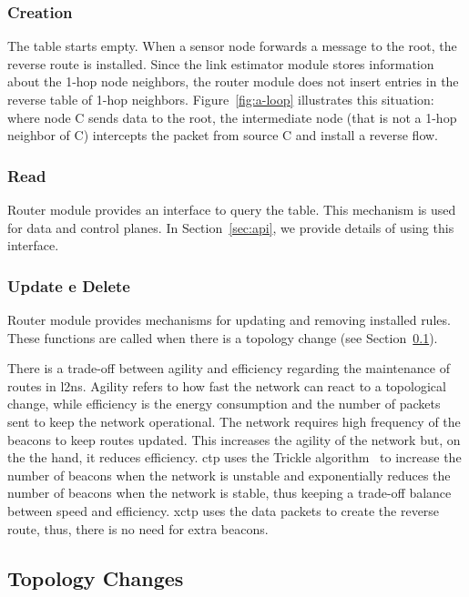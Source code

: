 \subsubsection{Creation} The table starts empty. When a sensor node forwards a message to the root, the reverse route is installed. Since the link estimator module stores information about the 1-hop node neighbors, the router module does not insert entries in the reverse table of 1-hop neighbors. Figure~\ref{fig:a-loop} illustrates this situation: where node C sends data to the root, the intermediate node (that is not a 1-hop neighbor of C) intercepts the packet from source C and install a reverse flow.

\subsubsection{Read} Router module provides an interface to query the table. This mechanism is used for data and control planes. In Section~\ref{sec:api}, we provide details of using this interface.

\subsubsection{Update e Delete} Router module provides mechanisms for updating and removing installed rules. These functions are called when there is a topology change (see Section~\ref{sec:topology-changes}).

There is a trade-off between agility and efficiency regarding the maintenance of routes in \ac{l2ns}. Agility refers to how fast the network can react to a topological change, while efficiency is the energy consumption and the number of packets sent to keep the network operational. The network requires high frequency of the beacons to keep routes updated. This increases the agility of the network but, on the the hand, it reduces efficiency. \ac{ctp} uses the Trickle algorithm~\cite{trickle} to increase the number of beacons when the network is unstable and exponentially reduces the number of beacons when the network is stable, thus keeping a trade-off balance between speed and efficiency. \ac{xctp} uses the data packets to create the reverse route, thus, there is no need for extra beacons.

\subsection{Topology Changes}
\label{sec:topology-changes}


